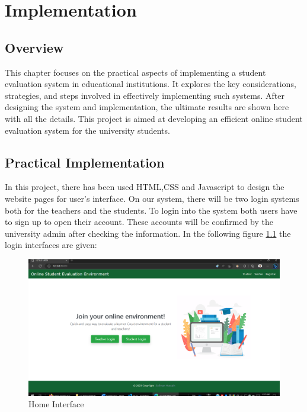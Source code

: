 \chapter{Implementation}
\section{Overview}
This chapter focuses on the practical aspects of implementing a student evaluation system in educational institutions. It explores the key considerations, strategies, and steps involved in effectively implementing such systems.  After designing the system and implementation, the ultimate results are shown here with all the details. This project is aimed at developing an efficient online student evaluation system for the university students.



\section{Practical Implementation}
In this project, there has been used HTML,CSS and Javascript to design the website pages for user’s interface. On our system, there will be two login systems both for the teachers and the students. To login into the system both users have to sign up to open their account. These accounts will be confirmed by the university admin after checking the information. In the following figure
\ref{fig:home} the login interfaces are given:
\begin{figure}[H]
    \centering
    \includegraphics[scale=.35]{img/home.png}
    \caption{Home Interface}
    \label{fig:home}
\end{figure}


